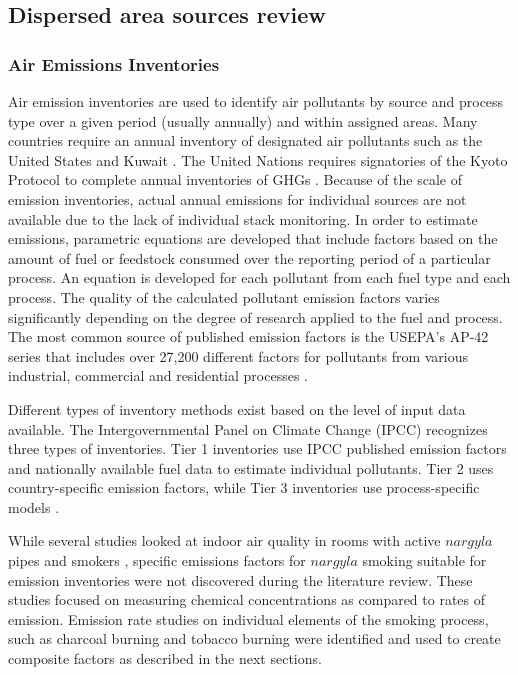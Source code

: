 \subsection{Dispersed area sources review}

\subsubsection{Air Emissions Inventories}

Air emission inventories are used to identify air pollutants by source and process type over a given period (usually annually) and within assigned areas.  Many countries require an annual inventory of designated air pollutants such as the United States \citep{USEPA2014} and Kuwait \citep{KEPA2017}.  The United Nations requires signatories of the Kyoto Protocol to complete annual inventories of GHGs \citep{Paciornik2006}.  Because of the scale of emission inventories, actual annual emissions for individual sources are not available due to the lack of individual stack monitoring. In order to estimate emissions, parametric equations are developed that include factors based on the amount of fuel or feedstock consumed over the reporting period of a particular process.  An equation is developed for each pollutant from each fuel type and each process.  The quality of the calculated pollutant emission factors varies significantly depending on the degree of research applied to the fuel and process.  The most common source of published emission factors is the USEPA’s AP-42 series that includes over 27,200 different factors for pollutants from various industrial, commercial and residential processes \citep{USEPA1995}.

Different types of inventory methods exist based on the level of input data available. The Intergovernmental Panel on Climate Change (IPCC) recognizes three types of inventories.  Tier 1 inventories use IPCC published emission factors and nationally available fuel data to estimate individual pollutants.  Tier 2 uses country-specific emission factors, while Tier 3 inventories use process-specific models \citep{Paciornik2006}. 

While several studies looked at indoor air quality in rooms with active $nargyla$ pipes and smokers \citep{Fromme2009, Moon2015, Mulla2015}, specific emissions factors for $nargyla$ smoking suitable for emission inventories were not discovered during the literature review. These studies focused on measuring chemical concentrations as compared to rates of emission. Emission rate studies on individual elements of the smoking process, such as charcoal burning and tobacco burning were identified and used to create composite factors as described in the next sections. 

